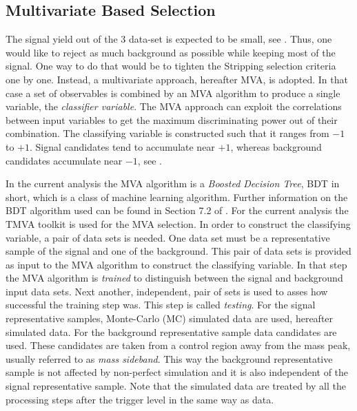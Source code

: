 \subsection{Multivariate Based Selection}
\label{Multivariate_Based_Selection}

The \BsJpsiKst signal yield out of the 3 \invfb data-set is expected to be small, see . Thus, one would like to
reject as much background as possible while keeping most of the signal. One way to do that would be to tighten the Stripping
selection criteria one by one. Instead, a multivariate approach, hereafter MVA, is adopted.
In that case a set of observables is combined by an MVA algorithm to produce a single variable, the {\it classifier variable}.
The MVA approach can exploit the correlations between input variables to get the maximum discriminating power out of their combination.
The classifying variable is constructed such that it ranges from $-1$ to $+1$. Signal candidates tend to accumulate near $+1$,
whereas background candidates accumulate near $-1$, see .

In the current analysis the MVA algorithm is a {\it Boosted Decision Tree}, BDT in short, which is a class
of machine learning  algorithm. Further information on the BDT algorithm used can be found in Section 7.2 of \cite{TMVA}.
For the current analysis the TMVA toolkit \cite{TMVA} is used for the MVA selection. In order to construct the classifying variable,
a pair of data sets is needed. One data set must be a representative sample of the signal and one of the background.
This pair of data sets is provided as input to the MVA algorithm to construct the classifying variable.
In that step the MVA algorithm is {\it trained} to distinguish between the signal and background input data sets.
Next another, independent, pair of sets is used to asses how successful the training step was. This step is called {\it testing}.
For the signal representative samples, \BsJpsiKst Monte-Carlo (MC) simulated data are used, hereafter simulated data.
For the background representative sample data candidates are used. These candidates are taken from a control
region away from the \BsJpsiKst mass peak, usually referred to as {\it mass sideband}. This way the background representative sample
is not affected by non-perfect simulation and it is also independent of the signal representative sample.
Note that the simulated data are treated by all the processing steps after the \lzero trigger level in the same way as data.

